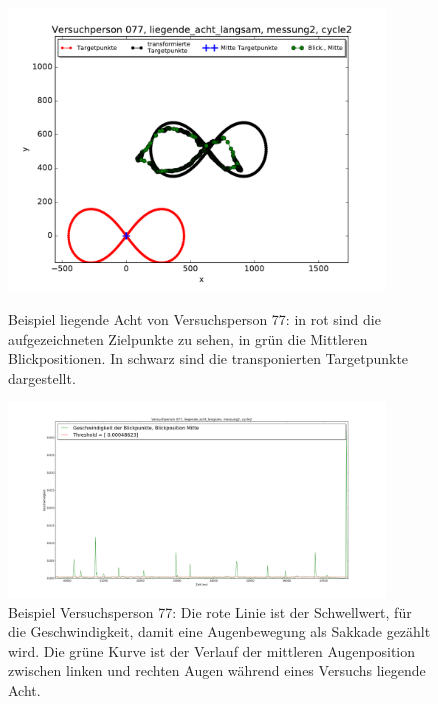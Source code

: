 \documentclass[12pt]{article}
\begin{document}
\begin{landscape}
\begin{figure}[t]
	\begin{minipage}[ht]{10cm}
	\noindent \begin{centering}	
		\includegraphics[width=10cm]{Bilder/AufzeichnungVP77.pdf}
		\par\end{centering}
	\caption{\label{fig:rohdaten}Beispiel liegende Acht von Versuchsperson 77: in rot sind die aufgezeichneten Zielpunkte zu sehen, in gr\"un die Mittleren Blickpositionen. In schwarz sind die transponierten Targetpunkte dargestellt.}
    \end{minipage}
	\qquad
    \begin{minipage}[ht]{10cm}	
	\noindent \begin{centering}
		\includegraphics[width=10cm]{Bilder/figure_saccade_vp_77.png}
		\par\end{centering}
	\caption{\label{fig:DiagrammSakkaden}Beispiel Versuchsperson 77: Die rote Linie ist der Schwellwert, f\"ur die Geschwindigkeit, damit eine Augenbewegung als Sakkade gez\"ahlt wird. Die gr\"une Kurve ist der Verlauf der mittleren Augenposition zwischen linken und rechten Augen w\"ahrend eines Versuchs liegende Acht.}
    \end{minipage}
\end{figure}
\end{landscape}




\end{document}

